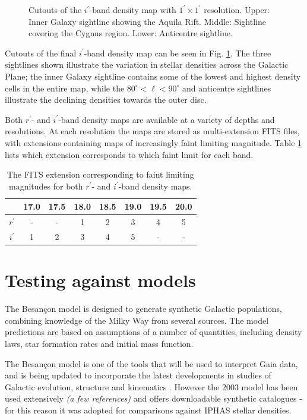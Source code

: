 \documentclass[a4paper,useAMS,usenatbib]{mn2e}
\begin{document}
\begin{figure}
\begin{center}
\caption{\footnotesize Cutouts of the $i^{\prime}$-band density map with $1^{\prime}\times1^{\prime}$ resolution. Upper: Inner Galaxy sightline showing the Aquila Rift. Middle: Sightline covering the Cygnus region. Lower: Anticentre sightline.}
\label{fig:dmap_cutout}
\end{center}
\end{figure}

Cutouts of the final $i^{\prime}$-band density map can be seen in Fig. \ref{fig:dmap_cutout}. The three sightlines shown illustrate the variation in stellar densities across the Galactic Plane; the inner Galaxy sightline contains some of the lowest and highest density cells in the entire map, while the $80^{\circ}<\ell<90^{\circ}$ and anticentre sightlines illustrate the declining densities towards the outer disc.

Both $r^{\prime}$- and $i^{\prime}$-band density maps are available at a variety of depths and resolutions. At each resolution the maps are stored as multi-extension FITS files, with extensions containing maps of increasingly faint limiting magnitude. Table \ref{table:fits_extensions} lists which extension corresponds to which faint limit for each band.

\begin{table}
\centering
\begin{tabular}{|c|ccccccc|}
\hline
 & 17.0 & 17.5 & 18.0 & 18.5 & 19.0 & 19.5 & 20.0  \\
\hline
$r^{\prime}$ &	- &	- &	1 &	2 &	3 &	4 &	5 \\
$i^{\prime}$ &	1 &	2 &	3 &	4 &	5 &	- &	-  \\
\hline
\end{tabular}
\caption{\footnotesize The FITS extension corresponding to faint limiting magnitudes for both $r^{\prime}$- and $i^{\prime}$-band density maps.}
\label{table:fits_extensions}
\end{table}

\section[]{Testing against models}
The Besan\c{c}on model \citep{Robin2003} is designed to generate synthetic Galactic populations, combining knowledge of the Milky Way from several sources. The model predictions are based on assumptions of a number of quantities, including density laws, star formation rates and initial mass function.

The Besan\c{c}on model is one of the tools that will be used to interpret Gaia data, and is being updated to incorporate the latest developments in studies of Galactic evolution, structure and kinematics \citep{Czekaj2014}. However the 2003 model has been used extensively \textit{(a few references)} and offers downloadable synthetic catalogues - for this reason it was adopted for comparisons against IPHAS stellar densities.
\end{document}
